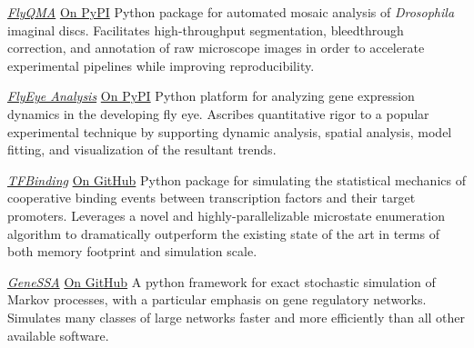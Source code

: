 
\begin{cventries}
    
    \cventrynew
	{\emph{\href{https://sebastianbernasek.github.io/flyqma/index.html}{FlyQMA}}}    
    {\href{https://pypi.org/project/flyqma/}{On PyPI}}
    {} 
    {Python package for automated mosaic analysis of \emph{Drosophila} imaginal discs. Facilitates high-throughput segmentation, bleedthrough correction, and annotation of raw microscope images in order to accelerate experimental pipelines while improving reproducibility.}
        
    \cventrynew
	{\emph{\href{https://github.com/sebastianbernasek/flyeye}{FlyEye Analysis}}}    
    {\href{https://pypi.org/project/flyeye}{On PyPI}}
    {}
    {Python platform for analyzing gene expression dynamics in the developing fly eye. Ascribes quantitative rigor to a popular experimental technique by supporting dynamic analysis, spatial analysis, model fitting, and visualization of the resultant trends.}
    
     \cventrynew
	{\emph{\href{https://github.com/sebastianbernasek/binding}{TFBinding}}}    
    {\href{https://github.com/sebastianbernasek/binding}{On GitHub}} 
    {}
    {Python package for simulating the statistical mechanics of cooperative binding events between transcription factors and their target promoters. Leverages a novel and highly-parallelizable microstate enumeration algorithm to dramatically outperform the existing state of the art in terms of both memory footprint and simulation scale.}
     
     \cventrynew
	{\emph{\href{https://github.com/sebastianbernasek/genessa}{GeneSSA}}}    
    {\href{https://github.com/sebastianbernasek/genessa}{On GitHub}}
    {}
    {A python framework for exact stochastic simulation of Markov processes, with a particular emphasis on gene regulatory networks. Simulates many classes of large networks faster and more efficiently than all other available software.}

\end{cventries}


